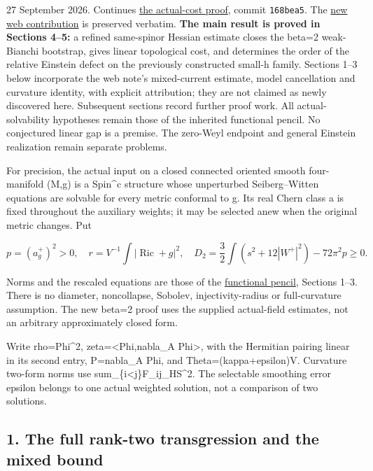 \documentclass[
  10pt,
]{article}
\begin{document}
27 September 2026. Continues
\href{20260926_actual_topological_cost.md}{the actual-cost proof},
commit \texttt{168bea5}. The
\href{../guidance/source/20260927_web_critical_mixed_term.zh.md}{new web
contribution} is preserved verbatim. \textbf{The main result is proved
in Sections 4--5:} a refined same-spinor Hessian estimate closes the
beta=2 weak-Bianchi bootstrap, gives linear topological cost, and
determines the order of the relative Einstein defect on the previously
constructed small-h family. Sections 1--3 below incorporate the web
note's mixed-current estimate, model cancellation and curvature
identity, with explicit attribution; they are not claimed as newly
discovered here. Subsequent sections record further proof work. All
actual-solvability hypotheses remain those of the inherited functional
pencil. No conjectured linear gap is a premise. The zero-Weyl endpoint
and general Einstein realization remain separate problems.

For precision, the actual input on a closed connected oriented smooth
four-manifold (M,g) is a Spin\^{}c structure whose unperturbed
Seiberg--Witten equations are solvable for every metric conformal to g.
Its real Chern class a is fixed throughout the auxiliary weights; it may
be selected anew when the original metric changes. Put

\[
 p=(a_g^+)^2>0,\quad r=V^{-1}\int|\operatorname{Ric}+g|^2,\quad
 D_2=\frac32\int(s^2+12|W^+|^2)-72\pi^2p\ge0.
\]

Norms and the rescaled equations are those of the
\href{../mathematics/current/line1_functional_pencil.md}{functional
pencil}, Sections 1--3. There is no diameter, noncollapse, Sobolev,
injectivity-radius or full-curvature assumption. The new beta=2 proof
uses the supplied actual-field estimates, not an arbitrary approximately
closed form.

Write rho=\textbar Phi\textbar\^{}2, zeta=\textless Phi,nabla\_A
Phi\textgreater, with the Hermitian pairing linear in its second entry,
P=nabla\_A Phi, and Theta=(kappa+epsilon)V. Curvature two-form norms use
sum\_\{i\textless j\}\textbar F\_ij\textbar\_HS\^{}2. The selectable
smoothing error epsilon belongs to one actual weighted solution, not a
comparison of two solutions.

\hypertarget{the-full-rank-two-transgression-and-the-mixed-bound}{%
\subsection{1. The full rank-two transgression and the mixed
bound}\label{the-full-rank-two-transgression-and-the-mixed-bound}}
\end{document}
